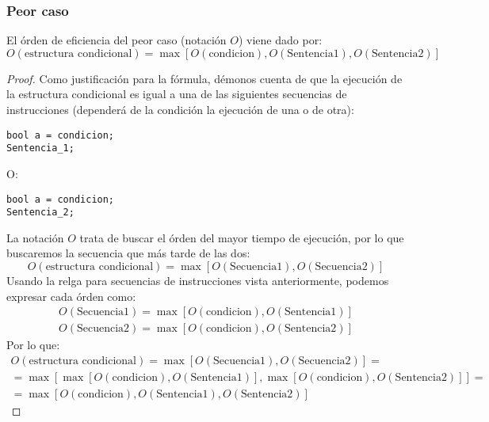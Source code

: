 \subsubsection{Peor caso}
El órden de eficiencia del peor caso (notación $O$) viene dado por:
\begin{equation*}
O(\mbox{estructura condicional}) = \max\left[O(\mbox{condicion}), O(\mbox{Sentencia1}), O(\mbox{Sentencia2})\right]
\end{equation*}
\begin{proof}
Como justificación para la fórmula, démonos cuenta de que la ejecución de la estructura condicional es igual a una de las siguientes secuencias de instrucciones (dependerá de la condición la ejecución de una o de otra):

\begin{listing}[H]
    \begin{verbatim}
bool a = condicion;
Sentencia_1;
    \end{verbatim}
\end{listing}
O:
\begin{listing}[H]
    \begin{verbatim}
bool a = condicion;
Sentencia_2;
    \end{verbatim}
\end{listing}

La notación $O$ trata de buscar el órden del mayor tiempo de ejecución, por lo que buscaremos la secuencia que más tarde de las dos:
\begin{equation*}
O(\mbox{estructura condicional}) = \max\left[O(\mbox{Secuencia1}), O(\mbox{Secuencia2})\right]
\end{equation*}
Usando la relga para secuencias de instrucciones vista anteriormente, podemos expresar cada órden como:
\begin{gather*}
O(\mbox{Secuencia1}) = \max\left[O(\mbox{condicion}), O(\mbox{Sentencia1})\right]\\
O(\mbox{Secuencia2}) = \max\left[O(\mbox{condicion}), O(\mbox{Sentencia2})\right]
\end{gather*}
Por lo que:
\begin{gather*}
O(\mbox{estructura condicional}) = \max\left[O(\mbox{Secuencia1}), O(\mbox{Secuencia2})\right] = \\
                                 = \max\left[\max\left[O(\mbox{condicion}), O(\mbox{Sentencia1})\right], \max\left[O(\mbox{condicion}), O(\mbox{Sentencia2})\right]\right] =\\
                                 = \max\left[O(\mbox{condicion}), O(\mbox{Sentencia1}), O(\mbox{Sentencia2})\right]
\end{gather*}
\end{proof}

